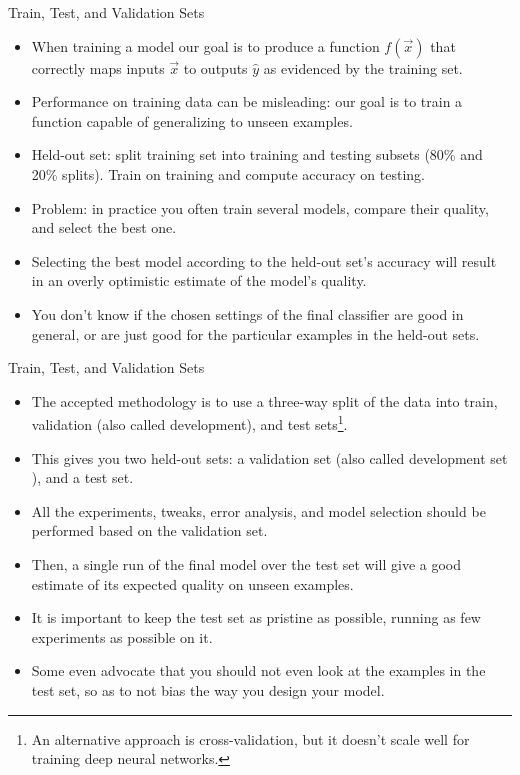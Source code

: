 \documentclass[handout]{beamer}
\begin{document}
\begin{frame}{Train, Test, and Validation Sets}
\begin{scriptsize}
\begin{itemize}
\item When training a model our goal is to produce a function $f(\vec{x})$ that correctly maps inputs $\vec{x}$ to outputs $\hat{y}$ as evidenced by the training set.
\item Performance on training data can be misleading: our goal is to train a function capable of generalizing to unseen examples.  
\item Held-out set: split training set into training and testing subsets (80\% and 20\% splits). Train on training and compute accuracy on testing.
\item Problem: in practice you often train several models, compare their quality, and select the best one. 
\item Selecting the best model according to the held-out set's accuracy will result in an overly optimistic estimate of the model's quality.
\item You don't know if the chosen settings of the final classifier are good in general, or are just good for the particular examples in the held-out sets.

\end{itemize}
\end{scriptsize}
\end{frame}


\begin{frame}{Train, Test, and Validation Sets}
\begin{scriptsize}
\begin{itemize}
\item The accepted methodology is to use a three-way split of the data into train, validation (also called development), and test sets\footnote{An alternative approach is cross-validation, but it doesn't scale well for training deep neural networks.}. 
\item This gives you two held-out sets: a validation set (also called development set ), and a test set.
\item All the experiments, tweaks, error analysis, and model selection should be performed based on the validation set. 
\item Then, a single run of the final model over the test set will give a good estimate of its expected quality on unseen examples. 
\item It is important to keep the test set as pristine as possible, running as few experiments as possible on it. 
\item Some even advocate that you should not even look at the examples in the test
set, so as to not bias the way you design your model.



\end{itemize}

\end{scriptsize}
\end{frame}
\end{document}
